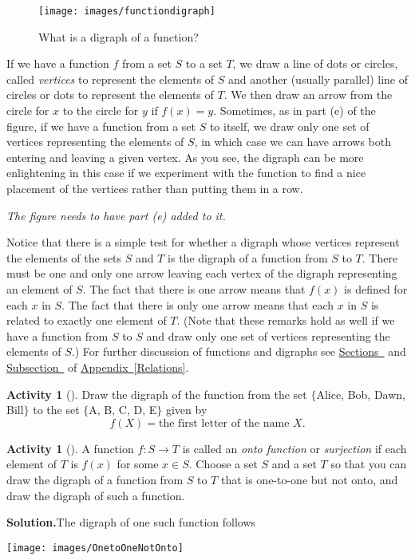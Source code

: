 \documentclass[10pt,]{book}
\theoremstyle{plain}
\theoremstyle{definition}
\newtheorem{activity}[project]{Activity}
\numberwithin{equation}{chapter}
\begin{document}
\begin{figure}
\centering
\texttt{[image: images/functiondigraph]}
\caption{What is a digraph of a function?\label{functiondigraphs}}
\end{figure}
If we have a function \(f\) from a set \(S\) to a set \(T\), we draw a line of dots or circles, called \emph{vertices} to represent the elements of \(S\) and another (usually parallel) line of circles or dots to represent the elements of \(T\). We then draw an arrow from the circle for \(x\) to the circle for \(y\) if \(f(x) = y\). Sometimes, as in part (e) of the figure, if we have a function from a set \(S\) to itself, we draw only one set of vertices representing the elements of \(S\), in which case we can have arrows both entering and leaving a given vertex. As you see, the digraph can be more enlightening in this case if we experiment with the function to find a nice placement of the vertices rather than putting them in a row.%
\par
\emph{The figure needs to have part (e) added to it.}%
\par
Notice that there is a simple test for whether a digraph whose vertices represent the elements of the sets \(S\) and \(T\) is the digraph of a function from \(S\) to \(T\). There must be one and only one arrow leaving each vertex of the digraph representing an element of \(S\). The fact that there is one arrow means that \(f(x)\) is defined for each \(x\) in \(S\). The fact that there is only one arrow means that each \(x\) in \(S\) is related to exactly one element of \(T\). (Note that these remarks hold as well if we have a function from \(S\) to \(S\) and draw only one set of vertices representing the elements of \(S\).) For further discussion of functions and digraphs see \hyperref[functionrelation]{Sections~} and \hyperref[relationdigraph]{Subsection~} of {\hyperref[Relations]{Appendix~\ref{Relations}}}.%
\begin{activity}[]\label{activity-23}
Draw the digraph of the function from the set \(\{\)Alice, Bob, Dawn, Bill\(\}\) to the set \(\{\)A, B, C, D, E\(\}\) given by%
\begin{equation*}
f(X) = \mbox{the first
letter of the name \(X\)} .
\end{equation*}
%
\end{activity}
\begin{activity}[]\label{activity-24}
A function \(f:S\rightarrow T\) is called an \emph{onto function} or \emph{surjection} if each element of \(T\) is \(f(x)\) for some \(x\in S\). Choose a set \(S\) and a set \(T\) so that you can draw the digraph of a function from \(S\) to \(T\) that is one-to-one but not onto, and draw the digraph of such a function.%
\par\medskip\noindent%
\textbf{Solution.}\quad The digraph of one such function follows%
\par
\texttt{[image: images/OnetoOneNotOnto]}
%
\end{activity}
\end{document}
